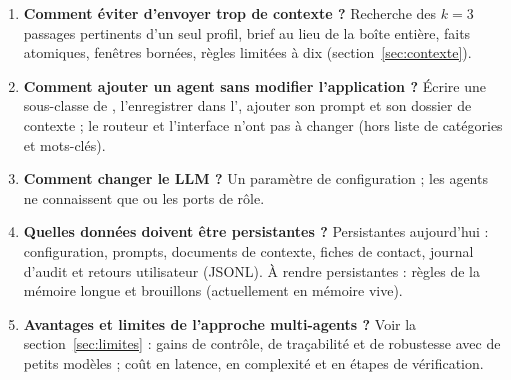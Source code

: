\begin{enumerate}
  \item \textbf{Comment éviter d'envoyer trop de contexte ?} Recherche des $k=3$ passages pertinents d'un seul profil, brief au lieu de la boîte entière, faits atomiques, fenêtres bornées, règles limitées à dix (section~\ref{sec:contexte}).
  \item \textbf{Comment ajouter un agent sans modifier l'application ?} Écrire une sous-classe de , l'enregistrer dans l', ajouter son prompt et son dossier de contexte ; le routeur et l'interface n'ont pas à changer (hors liste de catégories et mots-clés).
  \item \textbf{Comment changer le LLM ?} Un paramètre de configuration ; les agents ne connaissent que  ou les ports de rôle.
  \item \textbf{Quelles données doivent être persistantes ?} Persistantes aujourd'hui : configuration, prompts, documents de contexte, fiches de contact, journal d'audit et retours utilisateur (JSONL). À rendre persistantes : règles de la mémoire longue et brouillons (actuellement en mémoire vive).
  \item \textbf{Avantages et limites de l'approche multi-agents ?} Voir la section~\ref{sec:limites} : gains de contrôle, de traçabilité et de robustesse avec de petits modèles ; coût en latence, en complexité et en étapes de vérification.
\end{enumerate}
